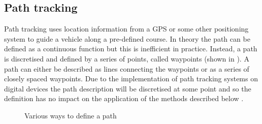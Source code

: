 \documentclass[main.tex]{subfiles}
\begin{document}
\subsection{Path tracking}
Path tracking uses location information from a GPS or some other positioning system to guide a vehicle along a pre-defined course. In theory the path can be defined as a continuous function but this is inefficient in practice. Instead, a path is discretised and defined by a series of points, called waypoints (shown in ). A path can either be described as lines connecting the waypoints or as a series of closely spaced waypoints. Due to the implementation of path tracking systems on digital devices the path description will be discretised at some point and so the definition has no impact on the application of the methods described below \parencite{Giesbrecht2005}.

\begin{figure}[htbp]
\centering
{}\hspace{1em}%
\hspace{1em}%
\caption{Various ways to define a path \parencite{Giesbrecht2005}}
\end{figure}
\end{document}
